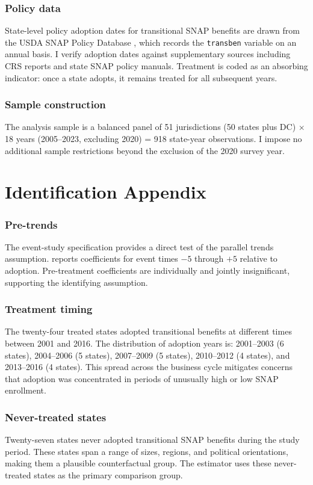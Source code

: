 \documentclass[12pt]{article}
\begin{document}
\subsubsection*{Policy data} State-level policy adoption dates for transitional SNAP benefits are drawn from the USDA SNAP Policy Database \citep{usda2023snap}, which records the \texttt{transben} variable on an annual basis. I verify adoption dates against supplementary sources including CRS reports and state SNAP policy manuals. Treatment is coded as an absorbing indicator: once a state adopts, it remains treated for all subsequent years.

\subsubsection*{Sample construction} The analysis sample is a balanced panel of 51 jurisdictions (50 states plus DC) $\times$ 18 years (2005--2023, excluding 2020) = 918 state-year observations. I impose no additional sample restrictions beyond the exclusion of the 2020 survey year.


\section{Identification Appendix}
\label{sec:id_appendix}

\subsubsection*{Pre-trends} The event-study specification provides a direct test of the parallel trends assumption.  reports coefficients for event times $-5$ through $+5$ relative to adoption. Pre-treatment coefficients are individually and jointly insignificant, supporting the identifying assumption.

\subsubsection*{Treatment timing} The twenty-four treated states adopted transitional benefits at different times between 2001 and 2016. The distribution of adoption years is: 2001--2003 (6 states), 2004--2006 (5 states), 2007--2009 (5 states), 2010--2012 (4 states), and 2013--2016 (4 states). This spread across the business cycle mitigates concerns that adoption was concentrated in periods of unusually high or low SNAP enrollment.

\subsubsection*{Never-treated states} Twenty-seven states never adopted transitional SNAP benefits during the study period. These states span a range of sizes, regions, and political orientations, making them a plausible counterfactual group. The \citet{callaway2021difference} estimator uses these never-treated states as the primary comparison group.
\end{document}
